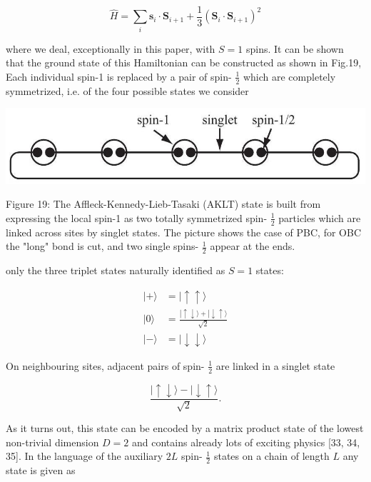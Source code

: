 \documentclass[12pt]{article}
\begin{document}
\begin{equation*}
\hat{H}=\sum_{i} \mathbf{s}_{i} \cdot \mathbf{S}_{i+1}+\frac{1}{3}\left(\mathbf{S}_{i} \cdot \mathbf{S}_{i+1}\right)^{2} \tag{78}
\end{equation*}


where we deal, exceptionally in this paper, with $S=1$ spins. It can be shown that the ground state of this Hamiltonian can be constructed as shown in Fig.19, Each individual spin-1 is replaced by a pair of spin- $\frac{1}{2}$ which are completely symmetrized, i.e. of the four possible states we consider

\begin{center}
\includegraphics[max width=\textwidth]{2024_05_04_afc4ad226da9ccfe0ac8g-032}
\end{center}

Figure 19: The Affleck-Kennedy-Lieb-Tasaki (AKLT) state is built from expressing the local spin-1 as two totally symmetrized spin- $\frac{1}{2}$ particles which are linked across sites by singlet states. The picture shows the case of PBC, for OBC the "long" bond is cut, and two single spins- $\frac{1}{2}$ appear at the ends.

only the three triplet states naturally identified as $S=1$ states:


\begin{align*}
|+\rangle & =|\uparrow \uparrow\rangle \\
|0\rangle & =\frac{|\uparrow \downarrow\rangle+|\downarrow \uparrow\rangle}{\sqrt{2}}  \tag{79}\\
|-\rangle & =|\downarrow \downarrow\rangle
\end{align*}


On neighbouring sites, adjacent pairs of spin- $\frac{1}{2}$ are linked in a singlet state


\begin{equation*}
\frac{|\uparrow \downarrow\rangle-|\downarrow \uparrow\rangle}{\sqrt{2}} . \tag{80}
\end{equation*}


As it turns out, this state can be encoded by a matrix product state of the lowest non-trivial dimension $D=2$ and contains already lots of exciting physics [33, 34, 35]. In the language of the auxiliary $2 L$ spin- $\frac{1}{2}$ states on a chain of length $L$ any state is given as
\end{document}
